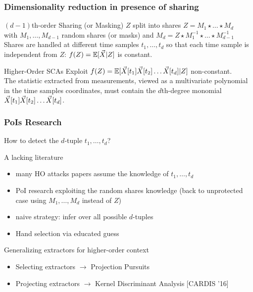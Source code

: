 \begin{frame}
\frametitle{Dimensionality reduction in presence of sharing}

\begin{block}{$(d-1)$th-order Sharing (or Masking)}
$Z$ split into shares  $Z = M_1 \star \dots \star M_d$ \\
with $M_1, \dots , M_{d-1}$ random shares (or masks) and $M_d = Z \star M_1^{-1}\star \dots \star M_{d-1}^{-1}$ \\
Shares are handled at different time samples $t_1,\dots, t_d$ so that each time sample is independent from $Z$: $f(Z) = \mathbb{E}[\vec{X}\lvert Z]$ is constant.
\end{block}
\pause
\begin{block}{Higher-Order SCAs}
Exploit $f(Z) = \mathbb{E}[\vec{X}[t_1]\vec{X}[t_2]\dots\vec{X}[t_d]\lvert Z]$ non-constant.\\
 
The statistic extracted from measurements, viewed as a multivariate polynomial in the time samples coordinates, must contain the $d$th-degree monomial $\vec{X}[t_1]\vec{X}[t_2]\dots\vec{X}[t_d]$.
\end{block}

\end{frame}

\begin{frame}
\frametitle{PoIs Research}
How to detect the $d$-tuple $t_1,\dots, t_d$? 
\begin{block}{A lacking literature}
\begin{itemize}
\item many HO attacks papers assume the knowledge of $t_1,\dots, t_d$
\item PoI research exploiting the random shares knowledge (back to unprotected case using $M_1,\dots , M_d$ instead of $Z$)
\item naive strategy: infer over all possible $d$-tuples 
\item Hand selection via educated guess \cite{Oswald2006}
\end{itemize}
\end{block}

\begin{block}{Generalizing extractors for higher-order context}
\begin{itemize}
\item Selecting extractors $\longrightarrow$ Projection Pursuits \cite{PP}
\item Projecting extractors $\longrightarrow$ Kernel Discriminant Analysis [CARDIS '16]
\end{itemize}
\end{block}
\end{frame}

